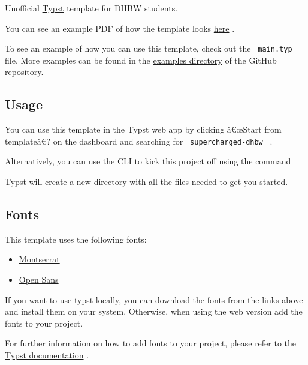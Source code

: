 \label{readme}
Unofficial \href{https://typst.app/}{Typst} template for DHBW students.

You can see an example PDF of how the template looks
\href{https://github.com/DannySeidel/typst-dhbw-template/blob/main/examples/example.pdf}{here}
.

To see an example of how you can use this template, check out the
\texttt{\ main.typ\ } file. More examples can be found in the
\href{https://github.com/DannySeidel/typst-dhbw-template/blob/main/examples}{examples
directory} of the GitHub repository.

\subsection{Usage}\label{usage}

You can use this template in the Typst web app by clicking â€œStart from
templateâ€? on the dashboard and searching for
\texttt{\ supercharged-dhbw\ } .

Alternatively, you can use the CLI to kick this project off using the
command

\begin{Shaded}
\begin{Highlighting}[]
\end{Highlighting}
\end{Shaded}

Typst will create a new directory with all the files needed to get you
started.

\subsection{Fonts}\label{fonts}

This template uses the following fonts:

\begin{itemize}
\tightlist
\item
  \href{https://fonts.google.com/specimen/Montserrat}{Montserrat}
\item
  \href{https://fonts.google.com/specimen/Open+Sans}{Open Sans}
\end{itemize}

If you want to use typst locally, you can download the fonts from the
links above and install them on your system. Otherwise, when using the
web version add the fonts to your project.

For further information on how to add fonts to your project, please
refer to the
\href{https://typst.app/docs/reference/text/text/\#parameters-font}{Typst
documentation} .

